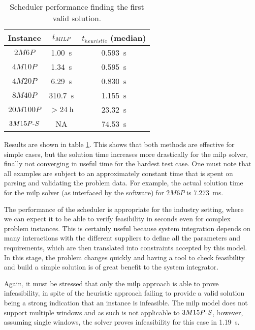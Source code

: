 \documentclass[main.tex]{subfiles}
\begin{document}
\begin{table}[htbp]
\centering
    \caption{Scheduler performance finding the first valid solution.}
    \label{tab:feasibility-results}
    \begin{tabular}{c c c}
        \toprule
        Instance           & $t_{MILP}$          & $t_{heuristic}$ (median) \\
        \midrule
        $2M6P$             & \SI{1.00}{\second}  & \SI{0.593}{\second} \\
        $4M10P$            & \SI{1.34}{\second}  & \SI{0.595}{\second} \\ 
        $4M20P$            & \SI{6.29}{\second}  & \SI{0.830}{\second} \\ 
        $8M40P$            & \SI{310.7}{\second} & \SI{1.155}{\second} \\
        $20M100P$          & $>\SI{24}{\hour}$   & \SI{23.32}{\second} \\
        \midrule
        $3M15P\text{-} S$ & NA                  & \SI{74.53}{\second} \\
        \bottomrule
    \end{tabular}
\end{table}

Results are shown in table \ref{tab:feasibility-results}.
This shows that both methods are effective for simple cases, but the solution time increases more drastically for the \gls{milp} solver, finally not converging in useful time for the hardest test case.
One must note that all examples are subject to an approximately constant time that is spent on parsing and validating the problem data.
For example, the actual solution time for the \gls{milp} solver (as interfaced by the software) for $2M6P$ is \SI{7.273}{\milli\second}.

The performance of the scheduler is appropriate for the industry setting, where we can expect it to be able to verify feasibility in seconds even for complex problem instances.
This is certainly useful because system integration depends on many interactions with the different suppliers to define all the parameters and requirements, which are then translated into constraints accepted by this model.
In this stage, the problem changes quickly and having a tool to check feasibility and build a simple solution is of great benefit to the system integrator.

Again, it must be stressed that only the \gls{milp} approach is able to prove infeasibility, in spite of the heuristic approach failing to provide a valid solution being a strong indication that an instance is infeasible.
The \gls{milp} model does not support multiple windows and as such is not applicable to $3M15P\text{-} S$, however, assuming single windows, the solver proves infeasibility for this case in \SI{1.19}{\second}.
\end{document}
